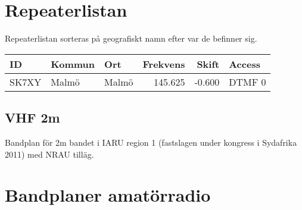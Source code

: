 \documentclass[10pt,swedish,a4paper]{article}
\begin{document}
\section{Repeaterlistan}

Repeaterlistan sorteras på geografiskt namn efter var de befinner sig.

\begin{tabular}{lllrrl}
	\textbf{ID} & \textbf{Kommun} & \textbf{Ort} & \textbf{Frekvens} & \textbf{Skift} & \textbf{Access} \\ \hline
	SK7XY       & Malmö           & Malmö        &           145.625 &         -0.600 & DTMF 0
\end{tabular}

\subsection{VHF 2m}

Bandplan för 2m bandet i IARU region 1 (fastslagen under kongress i Sydafrika 2011) med NRAU tilläg.


\section{Bandplaner amatörradio}
\end{document}
